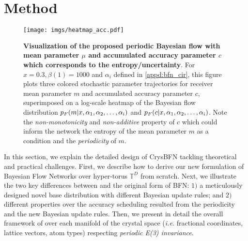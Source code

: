 \section{Method}\label{sec:method}
\begin{figure}
    \centering
    \texttt{[image: imgs/heatmap\_acc.pdf]}
    \caption{\textbf{Visualization of the proposed periodic Bayesian flow with mean parameter $\mu$ and accumulated accuracy parameter $c$ which corresponds to the entropy/uncertainty}. For $x = 0.3, \beta(1) = 1000$ and $\alpha_i$ defined in \cref{appd:bfn_cir}, this figure plots three colored stochastic parameter trajectories for receiver mean parameter $m$ and accumulated accuracy parameter $c$, superimposed on a log-scale heatmap of the Bayesian flow distribution $p_F(m|x,\alpha_1,\alpha_2,\dots,\alpha_i)$ and $p_F(c|x,\alpha_1,\alpha_2,\dots,\alpha_i)$. Note the \emph{non-monotonicity} and \emph{non-additive} property of $c$ which could inform the network the entropy of the mean parameter $m$ as a condition and the \emph{periodicity} of $m$. %
    }
    \label{fig:vmbf_vis}
    \vskip -0.1in
\end{figure}


In this section, we explain the detailed design of CrysBFN tackling theoretical and practical challenges. First, we describe how to derive our new formulation of Bayesian Flow Networks over hyper-torus $\mathbb{T}^{D}$ from scratch. Next, we illustrate the two key differences between \modelname and the original form of BFN: $1)$ a meticulously designed novel base distribution with different Bayesian update rules; and $2)$ different properties over the accuracy scheduling resulted from the periodicity and the new Bayesian update rules. Then, we present in detail the overall framework of \modelname over each manifold of the crystal space (\textit{i.e.} fractional coordinates, lattice vectors, atom types) respecting \textit{periodic E(3) invariance}. 

